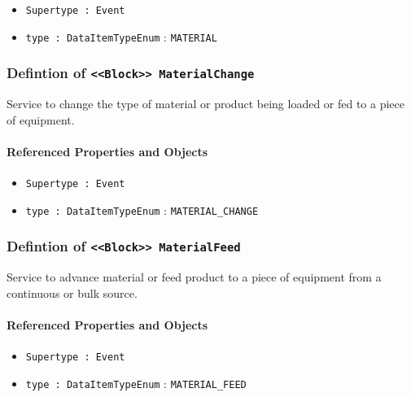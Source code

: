 \begin{itemize}
\item \texttt{Supertype : Event}

\item \texttt{type : DataItemTypeEnum} : \texttt{MATERIAL}

\end{itemize}
\FloatBarrier
\subsubsection{Defintion of \texttt{<<Block>> MaterialChange}}
  \label{type:MaterialChange}

\FloatBarrier

Service to change the type of material or product being loaded or fed to a piece of equipment.

\FloatBarrier
\paragraph{Referenced Properties and Objects}

\begin{itemize}
\item \texttt{Supertype : Event}

\item \texttt{type : DataItemTypeEnum} : \texttt{MATERIAL_CHANGE}

\end{itemize}
\FloatBarrier
\subsubsection{Defintion of \texttt{<<Block>> MaterialFeed}}
  \label{type:MaterialFeed}

\FloatBarrier

Service to advance material or feed product to a piece of equipment from a continuous or bulk source.

\FloatBarrier
\paragraph{Referenced Properties and Objects}

\begin{itemize}
\item \texttt{Supertype : Event}

\item \texttt{type : DataItemTypeEnum} : \texttt{MATERIAL_FEED}

\end{itemize}
\FloatBarrier
